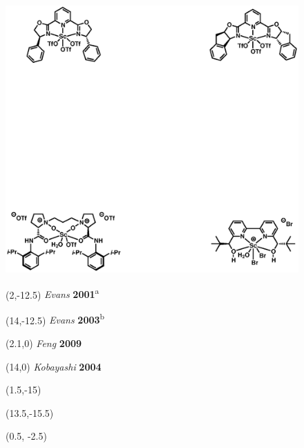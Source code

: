   \begin{figure}[p]
  \centering
  \vspace{1.6in}
  \includegraphics[scale=0.8]{chp_asymmetric/images/xraypage}
  \begin{textblock}{5}(2,-12.5) \small \textsf{\textit{Evans}
  \textbf{2001}\textsuperscript{a}}\end{textblock}
  \begin{textblock}{5}(14,-12.5) \small \textsf{\textit{Evans}
  \textbf{2003}\textsuperscript{b}}\end{textblock}
    \begin{textblock}{5}(2.1,0) \small \textsf{\textit{Feng}
   \textbf{2009}}\end{textblock}
   \begin{textblock}{5}(14,0) \small \textsf{\textit{Kobayashi}
   \textbf{2004}}\end{textblock} 
   \begin{textblock}{1}(1.5,-15)  \end{textblock}
   \begin{textblock}{1}(13.5,-15.5)  \end{textblock}
   \begin{textblock}{1}(0.5, -2.5)  \end{textblock}

\end{figure}

